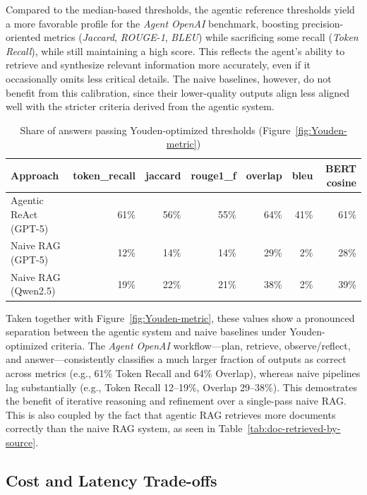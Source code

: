 Compared to the median-based thresholds, the agentic reference thresholds yield a more favorable profile for the \textit{Agent OpenAI} benchmark, boosting precision-oriented metrics (\textit{Jaccard}, \textit{ROUGE-1}, \textit{BLEU}) while sacrificing some recall (\textit{Token Recall}), while still maintaining a high score. This reflects the agent's ability to retrieve and synthesize relevant information more accurately, even if it occasionally omits less critical details. The naive baselines, however, do not benefit from this calibration, since their lower-quality outputs align less aligned well with the stricter criteria derived from the agentic system.

\begin{table}[htbp]
    \centering
    \begin{tabular}{l r r r r r r}
        \hline
        Approach & token\_recall & jaccard & rouge1\_f & overlap & bleu & \gls{BERT} cosine \\
        \hline
        Agentic ReAct (\gls{GPT}-5) & 61\% & 56\% & 55\% & 64\% & 41\% & 61\% \\
        Naive \gls{RAG} (\gls{GPT}-5) & 12\% & 14\% & 14\% & 29\% & 2\% & 28\% \\
        Naive \gls{RAG} (Qwen2.5) & 19\% & 22\% & 21\% & 38\% & 2\% & 39\% \\
        \hline
    \end{tabular}
    \caption{Share of answers passing Youden-optimized thresholds (Figure~\ref{fig:Youden-metric})}
    \label{tab:youden-metric-values}
\end{table}

Taken together with Figure~\ref{fig:Youden-metric}, these values show a pronounced separation between the agentic system and naive baselines under Youden-optimized criteria. The \textit{Agent OpenAI} workflow—plan, retrieve, observe/reflect, and answer—consistently classifies a much larger fraction of outputs as correct across metrics (e.g., 61\% Token Recall and 64\% Overlap), whereas naive pipelines lag substantially (e.g., Token Recall 12–19\%, Overlap 29–38\%). This demostrates the benefit of iterative reasoning and refinement over a single-pass naive RAG. This is also coupled by the fact that agentic RAG retrieves more documents correctly than the naive RAG system, as seen in Table~\ref{tab:doc-retrieved-by-source}.

\subsection{Cost and Latency Trade-offs}

